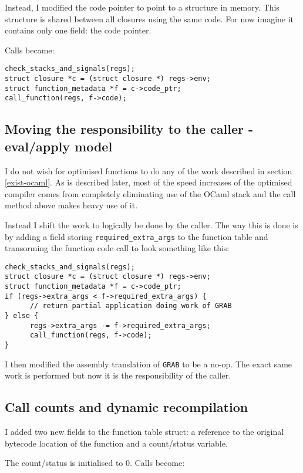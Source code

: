 Instead, I modified the code pointer to point to a structure in memory. This structure is shared
between all closures using the same code. For now imagine it contains only one field: the code
pointer.

Calls became:

\begin{verbatim}
check_stacks_and_signals(regs);
struct closure *c = (struct closure *) regs->env;
struct function_metadata *f = c->code_ptr;
call_function(regs, f->code);
\end{verbatim}

\subsection{Moving the responsibility to the caller - eval/apply model}

I do not wish for optimised functions to do any of the work described in section \ref{exist-ocaml}.
As is described later, most of the speed increases of the optimised compiler comes from completely
eliminating use of the OCaml stack and the call method above makes heavy use of it.

Instead I shift the work to logically be done by the caller. The way this is done is by adding a
field storing \texttt{required\_extra\_args} to the function table and transorming the function
code call to look something like this:

\begin{verbatim}
check_stacks_and_signals(regs);
struct closure *c = (struct closure *) regs->env;
struct function_metadata *f = c->code_ptr;
if (regs->extra_args < f->required_extra_args) {
      // return partial application doing work of GRAB
} else {
      regs->extra_args -= f->required_extra_args;
      call_function(regs, f->code);
}
\end{verbatim}

I then modified the assembly translation of \texttt{GRAB} to be a no-op. The exact same work is
performed but now it is the responsibility of the caller.

\subsection{Call counts and dynamic recompilation}

I added two new fields to the function table struct: a reference to the original bytecode location
of the function and a count/status variable.

The count/status is initialised to 0. Calls become:

